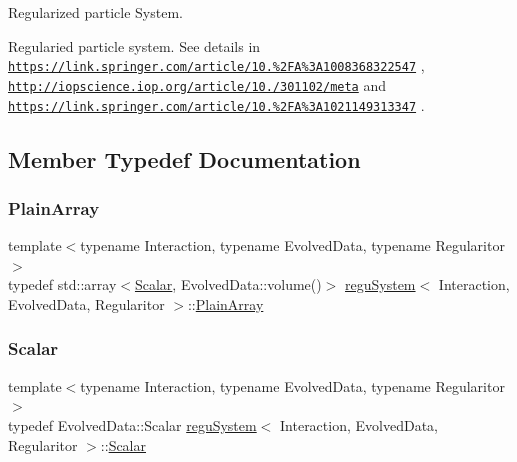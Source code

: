 Regularized particle System. 

Regularied particle system. See details in \href{https://link.springer.com/article/10.1023%2FA%3A1008368322547}{\tt https\+://link.\+springer.\+com/article/10.\+1023\%2\+F\+A\%3\+A1008368322547} , \href{http://iopscience.iop.org/article/10.1086/301102/meta}{\tt http\+://iopscience.\+iop.\+org/article/10.\+1086/301102/meta} and \href{https://link.springer.com/article/10.1023%2FA%3A1021149313347}{\tt https\+://link.\+springer.\+com/article/10.\+1023\%2\+F\+A\%3\+A1021149313347} . 

\subsection{Member Typedef Documentation}
\mbox{\label{classregu_system_ae2ca73edf865e016a858b694c1d2b49a}} 
\subsubsection{\texorpdfstring{Plain\+Array}{PlainArray}}
{\footnotesize\ttfamily template$<$typename Interaction, typename Evolved\+Data, typename Regularitor$>$ \\
typedef std\+::array$<$\mbox{\hyperlink{classregu_system_aca8ee2c387943164ee3ea68370fc3ac0}{Scalar}}, Evolved\+Data\+::volume()$>$ \mbox{\hyperlink{classregu_system}{regu\+System}}$<$ Interaction, Evolved\+Data, Regularitor $>$\+::\mbox{\hyperlink{classregu_system_ae2ca73edf865e016a858b694c1d2b49a}{Plain\+Array}}}

\mbox{\label{classregu_system_aca8ee2c387943164ee3ea68370fc3ac0}} 
\subsubsection{\texorpdfstring{Scalar}{Scalar}}
{\footnotesize\ttfamily template$<$typename Interaction, typename Evolved\+Data, typename Regularitor$>$ \\
typedef Evolved\+Data\+::\+Scalar \mbox{\hyperlink{classregu_system}{regu\+System}}$<$ Interaction, Evolved\+Data, Regularitor $>$\+::\mbox{\hyperlink{classregu_system_aca8ee2c387943164ee3ea68370fc3ac0}{Scalar}}}

